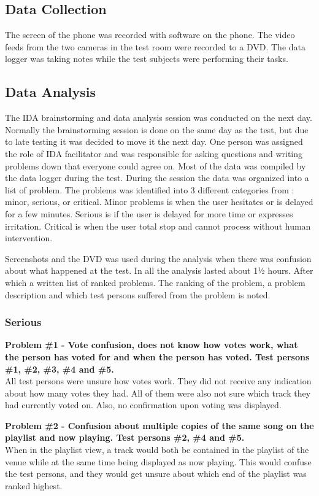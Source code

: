 \subsection{Data Collection}
The screen of the phone was recorded with software on the phone. The
video feeds from the two cameras in the test room were recorded to a
DVD. The data logger was taking notes while the test subjects were
performing their tasks.

\subsection{Data Analysis}
The IDA brainstorming and data analysis session was conducted on the next day. Normally the brainstorming session is done on the same day as the test, but due to late testing it was decided to move it the next day. One person was assigned the role of IDA facilitator and was responsible for asking questions and writing problems down that everyone could agree on. Most of the data was compiled by the data logger during the test. During the session the data was organized into a list of problem. The problems was identified into 3 different categories from \cite{molich2007usable}: minor, serious, or critical. Minor problems is when the user hesitates or is delayed for a few minutes. Serious is if the user is delayed for more time or expresses irritation. Critical is when the user total stop and cannot process without human intervention.

Screenshots and the DVD was used during the analysis when there was confusion about what happened at the test. In all the analysis lasted about 1½ hours. After which a written list of ranked problems. The ranking of the problem, a problem description and which test persons suffered from the problem is noted.

\subsubsection{Serious}
\textbf{Problem \#1 - Vote confusion, does not know how votes work, what the person has
    voted for and when the person has voted. Test persons \#1, \#2,
    \#3, \#4 and \#5.}\\
  All test persons were unsure how votes work. They did not receive
  any indication about how many votes they had. All of them were also
  not sure which track they had currently voted on. Also, no
  confirmation upon voting was displayed.

\noindent\textbf{Problem \#2 - Confusion about multiple copies of the same song on the playlist
    and now playing. Test persons \#2, \#4 and \#5.}\\
  When in the playlist view, a track would both be contained in the
  playlist of the venue while at the same time being displayed as now
  playing. This would confuse the test persons, and they would get
  unsure about which end of the playlist was ranked highest.

